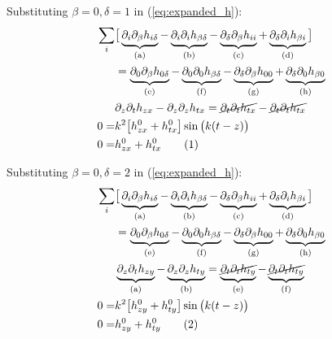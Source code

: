 \documentclass[]{article}
\newcommand\numberthis{\addtocounter{equation}{1}\tag{\theequation}}
\begin{document}
	Substituting $\beta=0,\delta=1$ in (\ref{eq:expanded_h}):
	\begin{align*}
	\sum_i&\big[\underbrace{\partial_i\partial_\beta h_{i\delta}}_\text{(a)} - \underbrace{\partial_i\partial_i h_{\beta\delta}}_\text{(b)} -  \underbrace{\partial_\delta\partial_\beta h_{ii}}_\text{(c)} + \underbrace{\partial_\delta\partial_i h_{\beta i}}_\text{(d)}\big]\\
	&=\underbrace{\partial_0\partial_\beta h_{0\delta}}_\text{(e)} - \underbrace{\partial_0\partial_0 h_{\beta\delta}}_\text{(f)} -  \underbrace{\partial_\delta\partial_\beta h_{00}}_\text{(g)} + \underbrace{\partial_\delta\partial_0 h_{\beta 0}}_\text{(h)}\\
	&\partial_z\partial_t h_{zx}-\partial_z\partial_z h_{tx}=\cancel{\partial_t\partial_t h_{tx}}-\cancel{\partial_t\partial_t h_{tx}}\\
	0=&k^2 \big[h^0_{zx}+h^0_{tx}\big] \sin\big(k(t-z)\big)\\
	0=&h^0_{zx}+h^0_{tx}  \numberthis \label{eq:con:01}
\end{align*}

Substituting $\beta=0,\delta=2$ in (\ref{eq:expanded_h}):
\begin{align*}
	\sum_i&\big[\underbrace{\partial_i\partial_\beta h_{i\delta}}_\text{(a)} - \underbrace{\partial_i\partial_i h_{\beta\delta}}_\text{(b)} -  \underbrace{\partial_\delta\partial_\beta h_{ii}}_\text{(c)} + \underbrace{\partial_\delta\partial_i h_{\beta i}}_\text{(d)}\big]\\
	&=\underbrace{\partial_0\partial_\beta h_{0\delta}}_\text{(e)} - \underbrace{\partial_0\partial_0 h_{\beta\delta}}_\text{(f)} -  \underbrace{\partial_\delta\partial_\beta h_{00}}_\text{(g)} + \underbrace{\partial_\delta\partial_0 h_{\beta 0}}_\text{(h)}\\
	&\underbrace{\partial_z\partial_t h_{zy}}_\text{(a)} - \underbrace{\partial_z\partial_z h_{ty}}_\text{(b)} =\underbrace{\cancel{\partial_t\partial_t h_{ty}}}_\text{(e)} - \underbrace{\cancel{\partial_t\partial_t h_{ty}}}_\text{(f)}\\
	0=&k^2 \big[h^0_{zy}+h^0_{ty}\big] \sin\big(k(t-z)\big)\\
	0=& h^0_{zy}+h^0_{ty} \numberthis \label{eq:con:02}
\end{align*}
\end{document}
